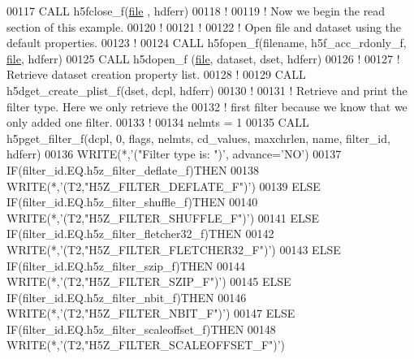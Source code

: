 \begin{DoxyCode}
00117   \textcolor{keyword}{CALL }h5fclose\_f(\hyperlink{structfile}{file} , hdferr)
00118   \textcolor{comment}{!}
00119   \textcolor{comment}{! Now we begin the read section of this example.}
00120   \textcolor{comment}{!}
00121   \textcolor{comment}{!}
00122   \textcolor{comment}{! Open file and dataset using the default properties.}
00123   \textcolor{comment}{!}
00124   \textcolor{keyword}{CALL }h5fopen\_f(filename, h5f\_acc\_rdonly\_f, \hyperlink{structfile}{file}, hdferr)
00125   \textcolor{keyword}{CALL }h5dopen\_f (\hyperlink{structfile}{file}, dataset, dset, hdferr)
00126   \textcolor{comment}{!}
00127   \textcolor{comment}{! Retrieve dataset creation property list.}
00128   \textcolor{comment}{!}
00129   \textcolor{keyword}{CALL }h5dget\_create\_plist\_f(dset, dcpl, hdferr)
00130   \textcolor{comment}{!}
00131   \textcolor{comment}{! Retrieve and print the filter type.  Here we only retrieve the}
00132   \textcolor{comment}{! first filter because we know that we only added one filter.}
00133   \textcolor{comment}{!}
00134   nelmts = 1
00135   \textcolor{keyword}{CALL }h5pget\_filter\_f(dcpl, 0, flags, nelmts, cd\_values, maxchrlen, name, filter\_id, hdferr)
00136   \textcolor{keyword}{WRITE}(*,\textcolor{stringliteral}{'("Filter type is: ")'}, advance=\textcolor{stringliteral}{'NO'})
00137   \textcolor{keywordflow}{IF}(filter\_id.EQ.h5z\_filter\_deflate\_f)\textcolor{keywordflow}{THEN}
00138      \textcolor{keyword}{WRITE}(*,\textcolor{stringliteral}{'(T2,"H5Z\_FILTER\_DEFLATE\_F")'})
00139   \textcolor{keywordflow}{ELSE} \textcolor{keywordflow}{IF}(filter\_id.EQ.h5z\_filter\_shuffle\_f)\textcolor{keywordflow}{THEN}
00140      \textcolor{keyword}{WRITE}(*,\textcolor{stringliteral}{'(T2,"H5Z\_FILTER\_SHUFFLE\_F")'})
00141   \textcolor{keywordflow}{ELSE} \textcolor{keywordflow}{IF}(filter\_id.EQ.h5z\_filter\_fletcher32\_f)\textcolor{keywordflow}{THEN}
00142      \textcolor{keyword}{WRITE}(*,\textcolor{stringliteral}{'(T2,"H5Z\_FILTER\_FLETCHER32\_F")'})
00143   \textcolor{keywordflow}{ELSE} \textcolor{keywordflow}{IF}(filter\_id.EQ.h5z\_filter\_szip\_f)\textcolor{keywordflow}{THEN}
00144      \textcolor{keyword}{WRITE}(*,\textcolor{stringliteral}{'(T2,"H5Z\_FILTER\_SZIP\_F")'})
00145   \textcolor{keywordflow}{ELSE} \textcolor{keywordflow}{IF}(filter\_id.EQ.h5z\_filter\_nbit\_f)\textcolor{keywordflow}{THEN}
00146      \textcolor{keyword}{WRITE}(*,\textcolor{stringliteral}{'(T2,"H5Z\_FILTER\_NBIT\_F")'})
00147   \textcolor{keywordflow}{ELSE} \textcolor{keywordflow}{IF}(filter\_id.EQ.h5z\_filter\_scaleoffset\_f)\textcolor{keywordflow}{THEN}
00148      \textcolor{keyword}{WRITE}(*,\textcolor{stringliteral}{'(T2,"H5Z\_FILTER\_SCALEOFFSET\_F")'})

\end{DoxyCode}
